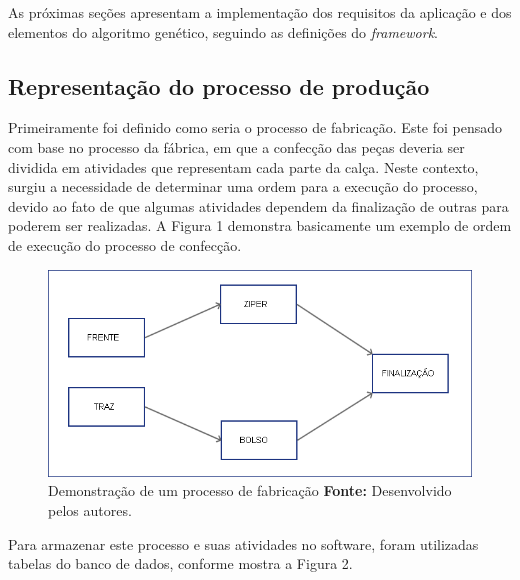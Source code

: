\par As próximas seções apresentam a implementação dos requisitos da aplicação
e dos elementos do algoritmo genético, seguindo as definições do \textit{framework}.

\subsection{Representação do processo de produção}

\par Primeiramente foi definido como seria o processo de fabricação. Este foi pensado com base no 
processo da fábrica, em que a confecção das peças deveria ser dividida em atividades que representam
cada parte da calça. Neste contexto, surgiu a necessidade de determinar uma ordem para a execução do processo, 
devido ao fato de que algumas atividades dependem da finalização de outras para poderem ser
realizadas. A Figura 1 demonstra basicamente um exemplo de ordem de execução do processo de confecção.

\newpage

\begin{figure}[h!]
	\centerline{\includegraphics[scale=0.6]{./imagens/processo1.png}}
	\caption[Processo de fabricação]
	{Demonstração de um processo de fabricação \textbf{Fonte:} Desenvolvido pelos
	autores.}
	\label{fig:exemplo1}
\end{figure}

\par Para armazenar este processo e suas atividades no software, foram
utilizadas tabelas do banco de dados, conforme mostra a Figura 2.

